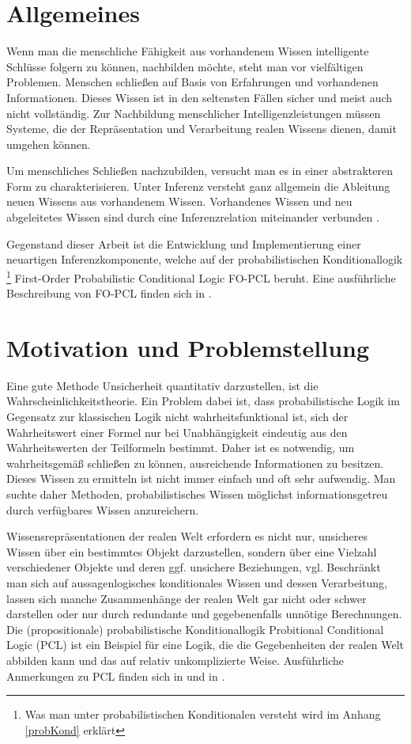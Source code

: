 \documentclass[a4paper, 11pt]{book}
\begin{document}
\section{Allgemeines}

Wenn man die menschliche Fähigkeit aus vorhandenem Wissen intelligente Schlüsse folgern zu können, nachbilden möchte, steht man vor vielfältigen Problemen. Menschen schließen auf Basis von Erfahrungen und vorhandenen Informationen. Dieses Wissen ist in den seltensten Fällen sicher und meist auch nicht vollständig. Zur Nachbildung menschlicher Intelligenzleistungen müssen Systeme, die der Repräsentation und Verarbeitung realen Wissens dienen, damit umgehen können.

Um menschliches Schließen nachzubilden, versucht man es in einer abstrakteren Form zu charakterisieren. Unter Inferenz versteht ganz allgemein die Ableitung neuen Wissens aus vorhandenem Wissen. Vorhandenes Wissen und neu abgeleitetes Wissen sind durch eine Inferenzrelation miteinander verbunden 
\cite[S. 20]{BKI08}.

Gegenstand dieser Arbeit ist die Entwicklung und Implementierung einer neuartigen Inferenzkomponente, welche auf der probabilistischen Konditionallogik \footnote{Was man unter probabilistischen Konditionalen versteht wird im Anhang \ref{probKond} erklärt } First-Order Probabilistic Conditional Logic FO-PCL  beruht. Eine ausführliche Beschreibung von FO-PCL finden sich in \cite[Kap. 6]{Fis10}. 

\section{Motivation und Problemstellung}

Eine gute Methode Unsicherheit quantitativ darzustellen, ist die Wahrscheinlichkeitstheorie. Ein Problem dabei ist, dass probabilistische Logik im Gegensatz zur klassischen Logik nicht wahrheitsfunktional ist, sich der Wahrheitswert einer Formel nur bei Unabhängigkeit  eindeutig aus den Wahrheitswerten der Teilformeln bestimmt. Daher ist es notwendig, um wahrheitsgemäß schließen zu können, ausreichende Informationen zu besitzen. Dieses Wissen zu ermitteln ist nicht immer einfach und oft sehr aufwendig. Man suchte daher Methoden, probabilistisches Wissen möglichst informationsgetreu durch verfügbares Wissen anzureichern. 

Wissensrepräsentationen der realen Welt erfordern es nicht nur, unsicheres Wissen über ein bestimmtes Objekt darzustellen, sondern über eine Vielzahl verschiedener Objekte und deren ggf. unsichere Beziehungen, vgl. \cite[S. 19]{Fis09}
Beschränkt man sich auf aussagenlogisches konditionales Wissen und dessen Verarbeitung, lassen sich manche Zusammenhänge der realen Welt gar nicht oder schwer darstellen oder nur durch redundante und gegebenenfalls unnötige Berechnungen. Die (propositionale) probabilistische Konditionallogik Probitional Conditional Logic (PCL)  ist ein Beispiel für eine Logik, die die Gegebenheiten der realen Welt abbilden kann und das auf relativ unkomplizierte Weise. Ausführliche Anmerkungen zu PCL finden sich in \cite{RKI96} und in \cite[Kap. 2.4]{Fis10}. 
\end{document}
